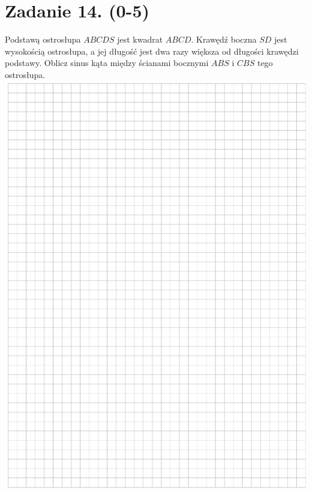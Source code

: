 \documentclass[10pt]{article}
\begin{document}
\section*{Zadanie 14. (0-5)}
Podstawą ostrosłupa \(A B C D S\) jest kwadrat \(A B C D\). Krawędź boczna \(S D\) jest wysokością ostrosłupa, a jej długość jest dwa razy większa od długości krawędzi podstawy. Oblicz sinus kąta między ścianami bocznymi \(A B S\) i \(C B S\) tego ostrosłupa.\\
\includegraphics[max width=\textwidth, center]{2024_11_21_838c0cfd77f195c20440g-16}\\
\end{document}
